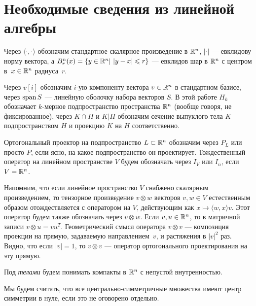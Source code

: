 \documentclass[a4paper,12pt]{article}
\def\span{\mathop{\rm span}}
\numberwithin{equation}{section}
\begin{document}
	\section{Необходимые сведения из линейной алгебры}
	Через $\langle\cdot,\cdot\rangle$ обозначим стандартное скалярное произведение в $\mathbb {R}^n$, $|\cdot|$ --- евклидову норму вектора, а $B^n_r(x)=\{y\in\mathbb {R}^n|\ |y-x|\leqslant r\}$ --- евклидов шар в $\mathbb {R}^n$ с центром в~$x\in\mathbb {R}^n$ радиуса~$r$.

	Через $v[i]$ обозначим $i$-ую компоненту вектора $v\in\mathbb {R}^n$ в стандартном базисе, через $\span S$ --- линейную оболочку набора векторов $S$. В этой работе $H_k$ обозначает $k$-мерное подпространство пространства $\mathbb {R}^n$ (вообще говоря, не фиксированное), через $K\cap H$ и $K|H$ обозначим сечение выпуклого тела $K$ подпространством $H$ и проекцию $K$ на $H$ соответственно.

	Ортогональный проектор на подпространство $L\subset\mathbb {R}^n$ обозначим через $P_L$ или просто $P$, если ясно, на какое подпространство он проектирует. Тождественный оператор на линейном пространстве $V$ будем обозначать через $I_V$ или $I_n$, если $V=\mathbb {R}^n$.

	Напомним, что если линейное пространство $V$ снабжено скалярным произведением, то тензорное произведение $v\otimes w$ векторов $v,w\in V$ естественным образом отождествляется с оператором на $V$, действующим как $x\mapsto\langle w, x\rangle v$. Этот оператор будем также обозначать через $v\otimes w$.  Если $v,u\in\mathbb {R}^n$, то в матричной записи $v\otimes u=vu^T$. Геометрический смысл оператора $v\otimes v$ --- композиция проекции на прямую, задаваемую направлением~$v$, и растяжения в $|v|^2$ раз. Видно, что если $|v|=1$, то $v\otimes v$ --- оператор ортогонального проектирования на эту прямую.

	Под \textit{телами} будем понимать компакты в $\mathbb {R}^n$ с непустой внутренностью.
	
	Мы будем считать, что все центрально-симметричные множества имеют центр симметрии в нуле, если это не оговорено отдельно.
\end{document}
